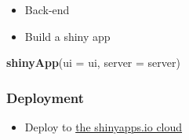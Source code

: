 \documentclass[
]{book}
\newenvironment{Shaded}{\begin{snugshade}}{\end{snugshade}}
\newcommand{\ControlFlowTok}[1]{\textcolor[rgb]{0.13,0.29,0.53}{\textbf{#1}}}
\newcommand{\DataTypeTok}[1]{\textcolor[rgb]{0.13,0.29,0.53}{#1}}
\newcommand{\KeywordTok}[1]{\textcolor[rgb]{0.13,0.29,0.53}{\textbf{#1}}}
\newcommand{\NormalTok}[1]{#1}
\newcommand{\OperatorTok}[1]{\textcolor[rgb]{0.81,0.36,0.00}{\textbf{#1}}}
\newcommand{\StringTok}[1]{\textcolor[rgb]{0.31,0.60,0.02}{#1}}
\providecommand{\tightlist}{%
  \setlength{\itemsep}{0pt}\setlength{\parskip}{0pt}}
\begin{document}
\begin{itemize}
\tightlist
\item
  Back-end
\end{itemize}

\begin{Shaded}
\end{Shaded}

\begin{itemize}
\tightlist
\item
  Build a shiny app
\end{itemize}

\begin{Shaded}
\begin{Highlighting}[]
\KeywordTok{shinyApp}\NormalTok{(}\DataTypeTok{ui =}\NormalTok{ ui, }\DataTypeTok{server =}\NormalTok{ server)}
\end{Highlighting}
\end{Shaded}

\hypertarget{deployment}{%
\subsubsection{Deployment}\label{deployment}}

\begin{itemize}
\tightlist
\item
  Deploy to \href{https://www.shinyapps.io/?_ga=2.5503866.871102833.1602978469-100003412.1602392815}{the shinyapps.io cloud}
\end{itemize}
\end{document}
